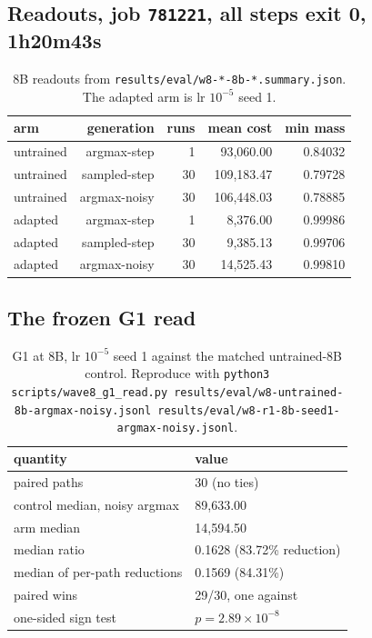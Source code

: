 \documentclass[11pt,a4paper]{article}
\begin{document}
\subsection*{Readouts, job \texttt{781221}, all steps exit 0, 1h20m43s}

\begin{table}[h]
\centering
\small
\begin{tabular}{@{}lrrrr@{}}
\toprule
\textbf{arm} & \textbf{generation} & \textbf{runs} & \textbf{mean cost} & \textbf{min mass} \\
\midrule
untrained & argmax-step & 1 & 93{,}060.00 & 0.84032 \\
untrained & sampled-step & 30 & 109{,}183.47 & 0.79728 \\
untrained & argmax-noisy & 30 & 106{,}448.03 & 0.78885 \\
adapted & argmax-step & 1 & 8{,}376.00 & 0.99986 \\
adapted & sampled-step & 30 & 9{,}385.13 & 0.99706 \\
adapted & argmax-noisy & 30 & 14{,}525.43 & 0.99810 \\
\bottomrule
\end{tabular}
\caption{8B readouts from \texttt{results/eval/w8-*-8b-*.summary.json}. The adapted arm is lr $10^{-5}$
seed 1.}
\label{tab:s7a}
\end{table}

\subsection*{The frozen G1 read}

\begin{table}[h]
\centering
\small
\begin{tabular}{@{}ll@{}}
\toprule
\textbf{quantity} & \textbf{value} \\
\midrule
paired paths & 30 (no ties) \\
control median, noisy argmax & 89{,}633.00 \\
arm median & 14{,}594.50 \\
median ratio & 0.1628 (83.72\% reduction) \\
median of per-path reductions & 0.1569 (84.31\%) \\
paired wins & 29/30, one against \\
one-sided sign test & $p = 2.89\times10^{-8}$ \\
\bottomrule
\end{tabular}
\caption{G1 at 8B, lr $10^{-5}$ seed 1 against the matched untrained-8B control. Reproduce with
\texttt{python3 scripts/wave8\_g1\_read.py results/eval/w8-untrained-8b-argmax-noisy.jsonl
results/eval/w8-r1-8b-seed1-argmax-noisy.jsonl}.}
\label{tab:s7b}
\end{table}
\end{document}
